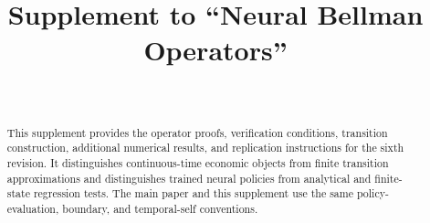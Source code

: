 \documentclass[ecta]{econsocart}
\begin{document}
\begin{frontmatter}
\title{Supplement to ``Neural Bellman Operators''}
\begin{aug}
\author[id=au1,addressref={add1}]{~}
\address[id=add1]{}
\end{aug}
\begin{abstract}
This supplement provides the operator proofs, verification conditions, transition construction, additional numerical results, and replication instructions for the sixth revision. It distinguishes continuous-time economic objects from finite transition approximations and distinguishes trained neural policies from analytical and finite-state regression tests. The main paper and this supplement use the same policy-evaluation, boundary, and temporal-self conventions.
\end{abstract}
\end{frontmatter}










\end{document}
